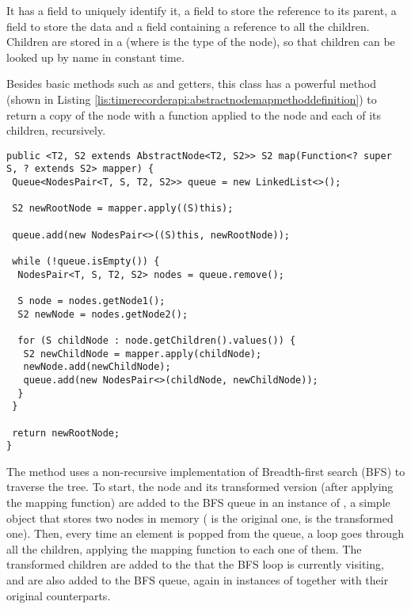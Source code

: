 \noindent It has a  field to uniquely identify it, a  field to store the reference to its parent, a  field to store the data and a  field containing a reference to all the children. Children are stored in a  (where  is the type of the node), so that children can be looked up by name in constant time.

\noindent Besides basic methods such as  and getters, this class has a powerful  method (shown in Listing \ref{lis:timerecorderapi:abstractnodemapmethoddefinition}) to return a copy of the node with a function applied to the node and each of its children, recursively.

\begin{lstlisting}[breaklines,caption={AbstractNode map method definition},label=lis:timerecorderapi:abstractnodemapmethoddefinition]
public <T2, S2 extends AbstractNode<T2, S2>> S2 map(Function<? super S, ? extends S2> mapper) {
 Queue<NodesPair<T, S, T2, S2>> queue = new LinkedList<>();

 S2 newRootNode = mapper.apply((S)this);

 queue.add(new NodesPair<>((S)this, newRootNode));

 while (!queue.isEmpty()) {
  NodesPair<T, S, T2, S2> nodes = queue.remove();

  S node = nodes.getNode1();
  S2 newNode = nodes.getNode2();

  for (S childNode : node.getChildren().values()) {
   S2 newChildNode = mapper.apply(childNode);
   newNode.add(newChildNode);
   queue.add(new NodesPair<>(childNode, newChildNode));
  }
 }

 return newRootNode;
}
\end{lstlisting}

\noindent The method uses a non-recursive implementation of Breadth-first search (BFS) \cite{EFM59} to traverse the tree. To start, the node and its transformed version (after applying the mapping function) are added to the BFS queue in an instance of , a simple object that stores two nodes in memory ( is the original one,  is the transformed one). Then, every time an element is popped from the queue, a loop goes through all the  children, applying the mapping function to each one of them. The transformed children are added to the  that the BFS loop is currently visiting, and are also added to the BFS queue, again in instances of  together with their original counterparts.

